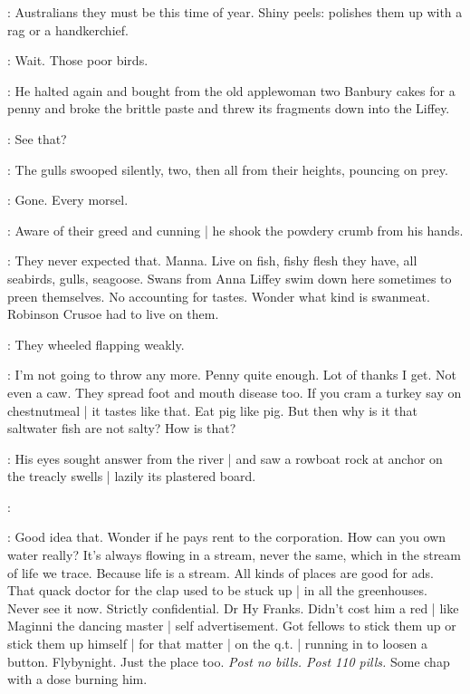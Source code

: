 \BloomInt:
Australians they must be this time of year.
Shiny peels:
polishes them up
with a rag or a handkerchief.

\BloomInt:
Wait.
Those poor birds.

:
He halted again and bought from the old applewoman
two Banbury cakes for a penny
and broke the brittle paste
and threw its fragments down into the Liffey.

\BloomInt:
See that?

:
The gulls swooped silently,
two,
then all from their heights,
pouncing on prey.

\BloomInt:
Gone.
Every morsel.

:
Aware of their greed and cunning |
he shook the powdery crumb from his hands.

\BloomInt:
They never expected that.
Manna.
Live on fish,
fishy flesh they have,
all seabirds,
gulls,
seagoose.
Swans from Anna Liffey swim down here sometimes
to preen themselves.
No accounting for tastes.
Wonder what kind is swanmeat.
Robinson Crusoe had to live on them.

:
They wheeled flapping weakly.

\BloomInt:
I'm not going to throw any more.
Penny quite enough.
Lot of thanks I get.
Not even a caw.
They spread foot and mouth disease too.
If you cram a turkey say on chestnutmeal |
it tastes like that.
Eat pig like pig.
But then why is it that saltwater fish are not salty?
How is that?

:
His eyes sought answer from the river |
and saw a rowboat rock at anchor on the treacly swells |
lazily its plastered board.

:


\BloomInt:
Good idea that.
Wonder if he pays rent to the corporation.
How can you own water really?
It's always flowing in a stream,
never the same,
which in the stream of life we trace.
Because life is a stream.
All kinds of places are good for ads.
That quack doctor for the clap used to be stuck up |
in all the greenhouses.
Never see it now.
Strictly confidential.
Dr Hy Franks.
Didn't cost him a red |
like Maginni the dancing master |
self advertisement.
Got fellows to stick them up
or stick them up himself |
for that matter |
on the q.t. |
running in to loosen a button.
Flybynight.
Just the place too.
\emph{Post no bills.
Post 110 pills.}
Some chap with a dose burning him.

